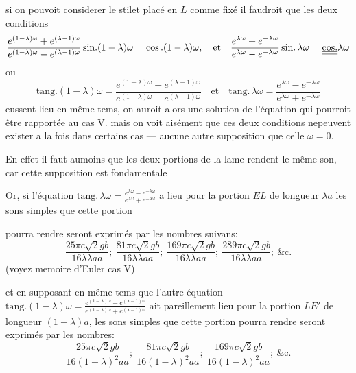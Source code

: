 \documentclass[11pt,a4paper]{article}
\begin{document}
si on pouvoit considerer le stilet placé en $L$ comme fixé il faudroit
 que les deux conditions
\[ \frac{e^{(1-\lambda)\omega}+e^{(\lambda-1)\omega}}{e^{(1-\lambda)\omega}-e^{(\lambda-1)\omega}}\,\text{sin.}(1-\lambda)\omega=\cos.(1-\lambda)\omega, \quad\text{et}\quad \frac{e^{\lambda\omega}+e^{-\lambda\omega}}{e^{\lambda\omega}-e^{-\lambda\omega}}\,\text{sin.}\,\lambda\omega=\struck{\uncertain{\text{cos.}}}\lambda\omega \]
ou
\[ \text{tang.}(1-\lambda)\omega=\frac{e^{(1-\lambda)\omega}-e^{(\lambda-1)\omega}}{e^{(1-\lambda)\omega}+e^{(\lambda-1)\omega}} \quad\text{et}\quad \text{tang.}\,\lambda\omega=\frac{e^{\lambda\omega}-e^{-\lambda\omega}}{e^{\lambda\omega}+e^{-\lambda\omega}} \]
eussent lieu en même tems, \struck{\ill{}} on auroit alors \struck{\ill{}}
une solution de l'équation qui  pourroit être rapportée au cas V. mais on voit aisément que ces deux
conditions nepeuvent  exister a la fois dans certains cas ---
 aucune autre supposition que celle $\omega=0$.

En effet il faut aumoins que les deux portions de la lame rendent le même
son, car cette supposition est fondamentale

Or, si l'équation
$\text{tang.}\,\lambda\omega=\frac{e^{\lambda\omega}-e^{-\lambda\omega}}{e^{\lambda\omega}+e^{-\lambda\omega}}$
a lieu pour la portion $E L$ de longueur $\lambda a$ les sons simples que
cette portion \struck{\ill{}}



pourra rendre seront exprimés par les nombres suivans:
\[ \frac{25\pi c\surd 2gb}{16\lambda\lambda aa};\ \frac{81\pi c\surd 2gb}{16\lambda\lambda aa};\ \frac{169\pi c\surd 2gb}{16\lambda\lambda aa};\ \frac{289\pi c\surd 2gb}{16\lambda\lambda aa};\ \text{\&c.} \]
(voyez memoire d'Euler cas V)

et en supposant en même tems que l'autre équation
$\text{tang.}(1-\lambda)\omega=\frac{e^{(1-\lambda)\omega}-e^{(\lambda-1)\omega}}{e^{(1-\lambda)\omega}+e^{(\lambda-1)\omega}}$
ait pareillement lieu pour la portion $L E'$ de longueur $(1-\lambda)a$, les
sons simples que cette portion pourra rendre seront exprimés par les
nombres:
\[ \frac{25\pi c\surd 2gb}{16(1-\lambda)^2aa};\ \frac{81\pi c\surd 2gb}{16(1-\lambda)^2aa};\ \frac{169\pi c\surd 2gb}{16(1-\lambda)^2aa};\ \text{\&c.} \]
\end{document}
